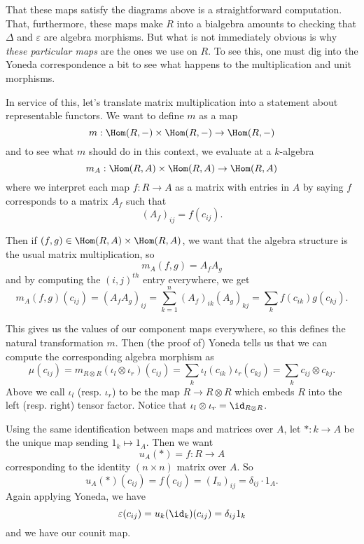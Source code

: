 \documentclass[12pt]{article}
\begin{document}
That these maps satisfy the diagrams above is a straightforward computation. That, furthermore, these maps make $R$ into a bialgebra amounts 
to checking that $\Delta$ and $\varepsilon$ are algebra morphisms.
But what is not immediately obvious is why \textit{these particular maps} are the ones we use on $R$. To 
see this, one must dig into the Yoneda correspondence a bit to see what happens to the multiplication and unit morphisms.

In service of this, let's translate matrix multiplication into a statement about representable functors. We want to define $m$ as a map 
\[m:\Hom(R,-)\times\Hom(R,-)\to \Hom(R,-)\]
and to see what $m$ should do in this context, we evaluate at a $k$-algebra 
\[m_A:\Hom(R,A)\times\Hom(R,A)\to \Hom(R,A)\]
where we interpret each map $f:R\to A$ as a matrix with entries in $A$ by saying $f$ corresponds to a matrix $A_f$ such that 
\[(A_f)_{ij}=f(c_{ij}).\]

Then if $(f,g)\in \Hom(R,A)\times\Hom(R,A)$, we want that the algebra structure is the usual matrix multiplication, so
\[m_A(f,g)=A_fA_g\]
and by computing the $(i,j)^{th}$ entry everywhere, we get 
\[m_A(f,g)(c_{ij})=(A_fA_g)_{ij}=\sum_{k=1}^n(A_f)_{ik}(A_g)_{kj}=\sum_k f(c_{ik})g(c_{kj}).\]

This gives us the values of our component maps everywhere, so this defines the natural transformation $m$. Then (the proof of)
Yoneda tells us that we can compute the corresponding algebra morphism as 
\[\mu(c_{ij})=m_{R\otimes R}(\iota_l\otimes\iota_r)(c_{ij})=\sum_k \iota_l(c_{ik})\iota_r(c_{kj})=\sum_k c_{ij}\otimes c_{kj}.\]
Above we call $\iota_l$ (resp. $\iota_r$) to be the map $R\to R\otimes R$ which embeds $R$ into the left (resp. right) tensor factor. Notice 
that $\iota_l\otimes\iota_r=\id_{R\otimes R}$.

Using the same identification between maps and matrices over $A$, let $\ast:k\to A$ be the unique map sending $1_k\mapsto 1_A$. Then we want
\[u_A(\ast)=f:R\to A\]
corresponding to the identity $(n\times n)$ matrix over $A$. So 
\[u_A(\ast)(c_{ij})=f(c_{ij})=(I_n)_{ij}=\delta_{ij}\cdot 1_A.\]
Again applying Yoneda, we have 
\[\varepsilon(c_{ij})=u_k(\id_k)(c_{ij})=\delta_{ij}1_k\]
and we have our counit map.
\end{document}

